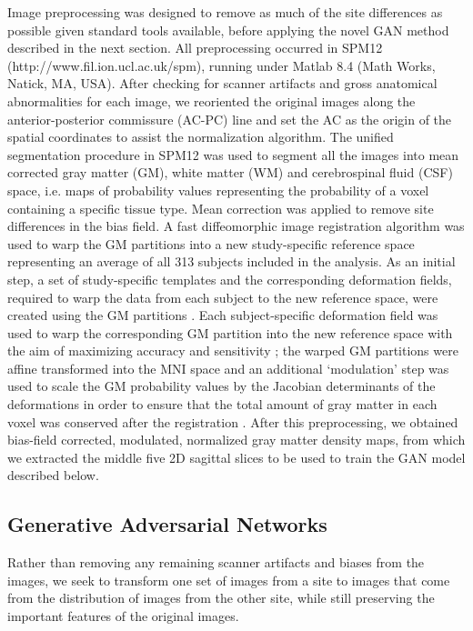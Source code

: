 Image preprocessing was designed to remove as much of the site differences as possible given standard tools available, before applying the novel GAN method described in the next section. All preprocessing occurred in SPM12 (http://www.fil.ion.ucl.ac.uk/spm), running under Matlab 8.4 (Math Works, Natick, MA, USA). After checking for scanner artifacts and gross anatomical abnormalities for each image, we reoriented the original images along the anterior-posterior commissure (AC-PC) line and set the AC as the origin of the spatial coordinates to assist the normalization algorithm. The unified segmentation procedure in SPM12 was used to segment all the images into mean corrected gray matter (GM), white matter (WM) and cerebrospinal fluid (CSF) space, i.e. maps of probability values representing the probability of a voxel containing a specific tissue type. Mean correction was applied to remove site differences in the bias field. A fast diffeomorphic image registration algorithm \citep{ashburner2007fast} was used to warp the GM partitions into a new study-specific reference space representing an average of all 313 subjects included in the analysis. As an initial step, a set of study-specific templates and the corresponding deformation fields, required to warp the data from each subject to the new reference space, were created using the GM partitions \citep{ashburner2009computing}. Each subject-specific deformation field was used to warp the corresponding GM partition into the new reference space with the aim of maximizing accuracy and sensitivity \citep{yassa2009quantitative}; the warped GM partitions were affine transformed into the MNI space and an additional `modulation' step was used to scale the GM probability values by the Jacobian determinants of the deformations in order to ensure that the total amount of gray matter in each voxel was conserved after the registration \citep{ashburner2000voxel,good2001cerebral,mechelli2005structural}. After this preprocessing, we obtained bias-field corrected, modulated, normalized gray matter density maps, from which we extracted the middle five 2D sagittal slices to be used to train the GAN model described below.

\subsection{Generative Adversarial Networks}
Rather than removing any remaining scanner artifacts and biases from the images, we seek to transform one set of images from a site to images that come from the distribution of images from the other site, while still preserving the important features of the original images.

